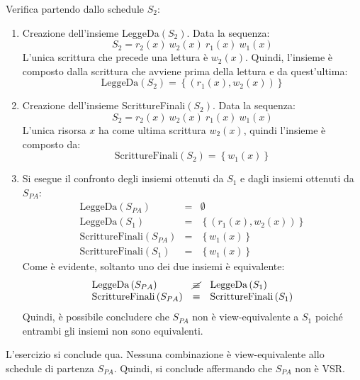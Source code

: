 \documentclass[a4paper]{article}
\begin{document}
	\noindent
	Verifica partendo dallo schedule $S_{2}$:
	\begin{enumerate}
		\item Creazione dell'insieme LeggeDa$\left(S_{2}\right)$. Data la sequenza:
		\begin{equation*}
			S_{2} = r_{2}\left(x\right) \: w_{2}\left(x\right) \: r_{1}\left(x\right) \: w_{1}\left(x\right)
		\end{equation*}
		L'unica scrittura che precede una lettura è $w_{2}\left(x\right)$. Quindi, l'insieme è composto dalla scrittura che avviene prima della lettura e da quest'ultima:
		\begin{equation*}
			\text{LeggeDa}\left(S_{2}\right) = \left\{\left(r_{1}\left(x\right), w_{2}\left(x\right)\right)\right\}
		\end{equation*}
		
		\item Creazione dell'insieme ScrittureFinali$\left(S_{2}\right)$. Data la sequenza:
		\begin{equation*}
			S_{2} = r_{2}\left(x\right) \: w_{2}\left(x\right) \: r_{1}\left(x\right) \: w_{1}\left(x\right)
		\end{equation*}
		L'unica risorsa $x$ ha come ultima scrittura $w_{2}\left(x\right)$, quindi l'insieme è composto da:
		\begin{equation*}
			\text{ScrittureFinali}\left(S_{2}\right) = \left\{w_{1}\left(x\right)\right\}
		\end{equation*}
		
		\item Si esegue il confronto degli insiemi ottenuti da $S_{1}$ e dagli insiemi ottenuti da $S_{PA}$:
		\begin{equation*}
			\begin{array}{lll}
				\text{LeggeDa}\left(S_{PA}\right)	&=& \emptyset \\
				\text{LeggeDa}\left(S_{1}\right)	&=& \left\{\left(r_{1}\left(x\right), w_{2}\left(x\right)\right)\right\} \\
				\text{ScrittureFinali}\left(S_{PA}\right)	&=& \left\{w_{1}\left(x\right)\right\} \\
				\text{ScrittureFinali}\left(S_{1}\right)	&=& \left\{w_{1}\left(x\right)\right\}
			\end{array}
		\end{equation*}
		Come è evidente, soltanto uno dei due insiemi è equivalente:
		\begin{equation*}
			\begin{array}{lll}
				\text{LeggeDa}\left(S_{PA}\right)	&\cancel{\equiv}& \text{LeggeDa}\left(S_{1}\right) \\
				\text{ScrittureFinali}\left(S_{PA}\right)	&\equiv& \text{ScrittureFinali}\left(S_{1}\right)
			\end{array}
		\end{equation*}
		Quindi, è possibile concludere che $S_{PA}$ non è view-equivalente a $S_{1}$ poiché entrambi gli insiemi non sono equivalenti.
	\end{enumerate}
	L'esercizio si conclude qua. Nessuna combinazione è view-equivalente allo schedule di partenza $S_{PA}$. Quindi, si conclude affermando che $S_{PA}$ non è VSR.\newpage
	
\end{document}
